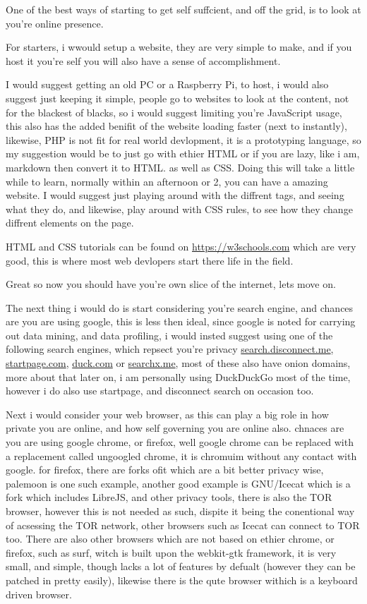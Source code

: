 \documentclass[../main.tex]{subfile}
\begin{document}
One of the best ways of starting to get self suffcient, and off the grid, is to look at you're online presence.

For starters, i wwould setup a website, they are very simple to make, and if you host it you're self you will also have a sense of accomplishment.

I would suggest getting an old PC or a Raspberry Pi, to host, i would also suggest just keeping it simple, people go to websites to look at the content, not for the blackest of blacks, so i would suggest limiting you're JavaScript usage, this also has the added benifit of the website loading faster (next to instantly), likewise, PHP is not fit for real world devlopment, it is a prototyping language, so my suggestion would be to just go with ethier HTML or if you are lazy, like i am, markdown then convert it to HTML. as well as CSS. Doing this will take a little while to learn, normally within an afternoon or 2, you can have a amazing website. I would suggest just playing around with the diffrent tags, and seeing what they do, and likewise, play around with CSS rules, to see how they change diffrent elements on the page.

HTML and CSS tutorials can be found on \url{https://w3schools.com} which are very good, this is where most web devlopers start there life in the field.

Great so now you should have you're own slice of the internet, lets move on.

The next thing i would do is start considering you're search engine, and chances are you are using google, this is less then ideal, since google is noted for carrying out data mining, and data profiling, i would insted suggest using one of the following search engines, which repsect you're privacy \url{search.disconnect.me}, \url{startpage.com}, \url{duck.com} or \url{searchx.me}, most of these also have onion domains, more about that later on, i am personally using DuckDuckGo most of the time, however i do also use startpage, and disconnect search on occasion too.

Next i would consider your web browser, as this can play a big role in how private you are online, and how self governing you are online also. chnaces are you are using google chrome, or firefox, well google chrome can be replaced with a replacement called ungoogled chrome, it is chromuim without any contact with google. for firefox, there are forks ofit which are a bit better privacy wise, palemoon is one such example, another good example is GNU/Icecat which is a fork which includes LibreJS, and other privacy tools, there is also the TOR browser, however this is not needed as such, dispite it being the conentional way of acsessing the TOR network, other browsers such as Icecat can connect to TOR too. There are also other browsers which are not based on ethier chrome, or firefox, such as surf, witch is built upon the webkit-gtk framework, it is very small, and simple, though lacks a lot of features by defualt (however they can be patched in pretty easily), likewise there is the qute browser withich is a keyboard driven browser.
\end{document}
